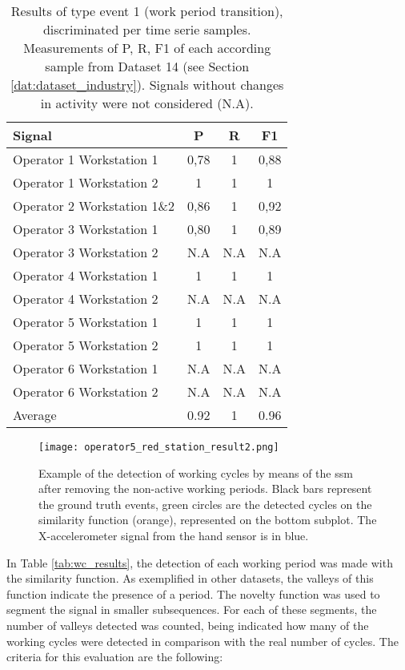 \begin{table}
\caption{Results of type event 1 (work period transition), discriminated per time serie samples. Measurements of \gls{P}, \gls{R}, \gls{F1} of each according sample from Dataset 14 (see Section \ref{dat:dataset_industry}). Signals without changes in activity were not considered (N.A).}
\label{tab:auto_scores}
\centering
\begin{tabular}{lccc}
\toprule
Signal         & \gls{P}    & \gls{R} & \gls{F1}\\
\midrule
Operator 1 Workstation 1      & 0,78 & 1 & 0,88\\
Operator 1 Workstation 2      & 1    & 1 & 1\\
Operator 2 Workstation 1\&2 & 0,86 & 1 & 0,92\\
Operator 3 Workstation 1    & 0,80 & 1 & 0,89\\
Operator 3 Workstation 2 & N.A & N.A & N.A\\
Operator 4 Workstation 1    & 1    & 1 & 1\\
Operator 4 Workstation 2 & N.A & N.A & N.A\\
Operator 5 Workstation 1      & 1    & 1 & 1\\
Operator 5 Workstation 2      & 1    & 1 & 1\\
Operator 6 Workstation 1 & N.A & N.A & N.A\\
Operator 6 Workstation 2 & N.A & N.A & N.A\\ 
\hline
Average & 0.92 & 1 & 0.96\\
\bottomrule
\end{tabular}
\end{table}

\begin{figure}
\texttt{[image: operator5\_red\_station\_result2.png]}
\caption{Example of the detection of working cycles by means of the \gls{ssm} after removing the non-active working periods. Black bars represent the ground truth events, green circles are the detected cycles on the similarity function (orange), represented on the bottom subplot. The X-accelerometer signal from the hand sensor is in blue.}
\label{fig:example_workcycle}
\end{figure}

In Table \ref{tab:wc_results}, the detection of each working period was made with the similarity function. As exemplified in other datasets, the valleys of this function indicate the presence of a period. The novelty function was used to segment the signal in smaller subsequences. For each of these segments, the number of valleys detected was counted, being indicated how many of the working cycles were detected in comparison with the real number of cycles. The criteria for this evaluation are the following:

